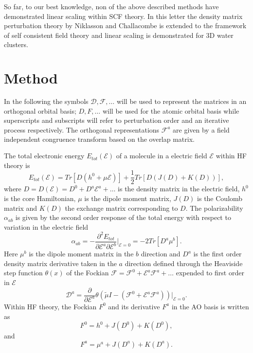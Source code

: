 \documentclass[twocolumn,showpacs,preprintnumbers,amsmath,amssymb]{revtex4}
\begin{document}
 So far, to our best knowledge, non of the above
 described methods have demonstrated
 linear scaling within SCF theory. In this letter the
 density matrix perturbation theory by Niklasson 
 and Challacombe \cite{Anders} is extended to the
 framework of self consistent field theory and linear
 scaling is demonstrated for 3D water clusters.
 
\section{Method}
 In the following the symbols $\mathcal{D},\mathcal{F},\dots$ 
 will be used to represent the matrices in an 
 orthogonal orbital basis; $D,F,\dots$ will be used for
 the atomic orbital basis while superscripts and subscripts
 will refer to perturbation order and an iterative process
 respectively. The orthogonal representations $\mathcal{F}^a$
 are given by a field independent congruence transform based
 on the overlap matrix.


 The total electronic energy $E_{tot}(\mathcal{E})$ 
 of a molecule in a electric field $\mathcal{E}$
 within HF theory is
 \begin{equation}
   E_{tot}(\mathcal{E})=Tr[D(h^0+\mu \mathcal{E})]
                       +\frac{1}{2}Tr[D(J(D)+K(D))],
 \end{equation}
 where $D=D(\mathcal{E})=D^0+D^a\mathcal{E}^a+\dots$
 is the density matrix in the electric field,
 $h^0$ is the core Hamiltonian, $\mu$ is the dipole 
 moment matrix, $J(D)$ is the Coulomb matrix
 and $K(D)$ the exchange matrix corresponding to $D$.
 The polarizability $\alpha_{ab}$ is given by the 
 second order response of the total energy
 with respect to variation in the electric field \cite{Sekino_1986}
 \begin{equation}\label{pol}
   \alpha_{ab}=
   -\frac{\partial^2 E_{tot}}{\partial \mathcal{E}^a\partial \mathcal{E}^b}
   \bigg|_{\mathcal{E}=0}=
   -2Tr[D^a\mu^b].
 \end{equation}
 Here $\mu^b$ is the dipole moment matrix in the $b$ direction
 and $D^a$ is the first order density matrix derivative 
 taken in the $a$ direction defined
 through the Heaviside step function $\theta(x)$ of the Fockian
 $\mathcal{F}=\mathcal{F}^{0}+\mathcal{E}^{a}\mathcal{F}^{a}+\dots$
 expended to first order in $\mathcal{E}$
 \begin{equation}\label{Step}
   \mathcal{D}^a=\frac{\partial}{\partial \mathcal{E}^a}
   \theta(\tilde{\mu} I-(\mathcal{F}^{0}+\mathcal{E}^{a}\mathcal{F}^{a}))
   \bigg|_{\mathcal{E}=0}.
 \end{equation}
 Within HF theory, the Fockian $F^0$ and its derivative $F^a$ in
 the AO basis is written as
 \begin{equation}\label{Fock}
   F^0=h^0+J(D^0)+K(D^0),
 \end{equation}
 and
 \begin{equation}\label{DFock}
   F^a=\mu^a+J(D^a)+K(D^a).
 \end{equation}
\end{document}
